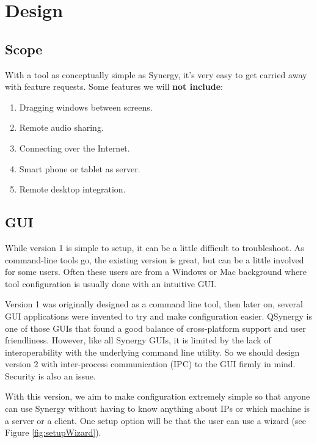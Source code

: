 \section{Design}

\subsection{Scope}

With a tool as conceptually simple as Synergy, it's very easy to get carried
away with feature requests. Some features we will \textbf{not include}:

\begin{enumerate}
  \item Dragging windows between screens.
  \item Remote audio sharing.
  \item Connecting over the Internet.
  \item Smart phone or tablet as server.
  \item Remote desktop integration.
\end{enumerate}

\subsection{GUI}


While version 1 is simple to setup, it can be a little difficult to
troubleshoot. As command-line tools go, the existing version is great, but
can be a little involved for some users. Often these users are from a Windows
or Mac background where tool configuration is usually done with an intuitive
GUI.

Version 1 was originally designed as a command line tool, then later on, several
GUI applications were invented to try and make configuration easier. QSynergy is
one of those GUIs that found a good balance of cross-platform support and user 
friendliness. However, like all Synergy GUIs, it is limited by the lack of 
interoperability with the underlying command line utility. So we should design 
version 2 with inter-process communication (IPC) to the GUI firmly in mind. 
Security is also an issue.

With this version, we aim to make configuration extremely simple so that anyone
can use Synergy without having to know anything about IPs or which machine is a
server or a client. One setup option will be that the user can use a wizard (see
Figure \ref{fig:setupWizard}).

